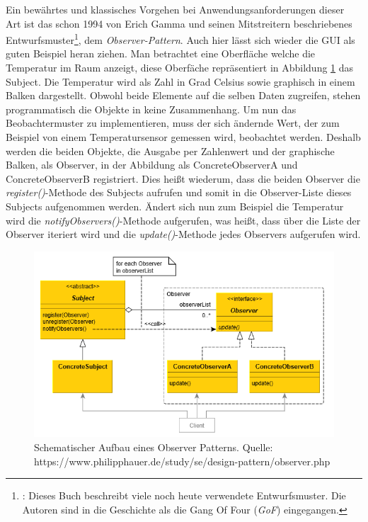 Ein bewährtes und klassisches Vorgehen bei Anwendungsanforderungen dieser Art ist das schon 1994 von Erich Gamma und seinen Mitstreitern beschriebenes Entwurfsmuster\footnote{\cite{Gamma.2011}: Dieses Buch beschreibt viele noch heute verwendete Entwurfsmuster. Die Autoren sind in die Geschichte als die Gang Of Four (\textit{GoF}) eingegangen.}, dem \textit{Observer-Pattern}. 
Auch hier lässt sich wieder die GUI als guten Beispiel heran ziehen. Man betrachtet eine Oberfläche welche die Temperatur im Raum anzeigt, diese Oberfäche repräsentiert in Abbildung \ref{pic:observerpattern} das Subject. Die Temperatur wird als Zahl in Grad Celsius sowie graphisch in einem Balken dargestellt. Obwohl beide Elemente auf die selben Daten zugreifen, stehen programmatisch die Objekte in keine Zusammenhang. Um nun das Beobachtermuster zu implementieren, muss der sich ändernde Wert, der zum Beispiel von einem Temperatursensor gemessen wird, beobachtet werden. Deshalb werden die beiden Objekte, die Ausgabe per Zahlenwert und der graphische Balken, als Observer, in der Abbildung als ConcreteObserverA und ConcreteObserverB registriert. Dies heißt wiederum, dass die beiden Observer die \textit{register()}-Methode des Subjects aufrufen und somit in die Observer-Liste dieses Subjects aufgenommen werden. Ändert sich nun zum Beispiel die Temperatur wird die \textit{notifyObservers()}-Methode aufgerufen, was heißt, dass über die Liste der Observer iteriert wird und die \textit{update()}-Methode jedes Observers aufgerufen wird.
\begin{figure}
	\centering
	\includegraphics[width=1\textwidth]{Abb/observerpattern}
	\caption{Schematischer Aufbau eines Observer Patterns. Quelle: https://www.philipphauer.de/study/se/design-pattern/observer.php}
	\label{pic:observerpattern}
\end{figure}
